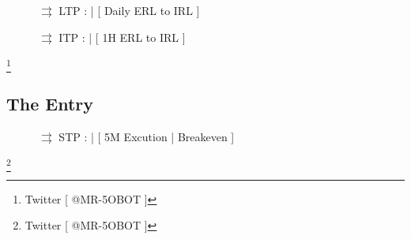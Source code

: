 \documentclass{article}
\begin{document}
\begin{figure}[h]
\begin{notebox}
\noindent \( \rightrightarrows \) \hspace{0.1cm}LTP : | [ Daily ERL to IRL ] 

  \begin{center}
  \end{center}
\end{notebox}

\begin{notebox}
   \( \rightrightarrows \) \hspace{0.1cm}ITP : | [ 1H ERL to IRL ]

  \begin{center}
  \end{center}
\end{notebox}
\end{figure}

\footnote{Twitter [ @MR-5OBOT ]}
\newpage

\subsection{The Entry}
\begin{figure}[h]
\begin{notebox}
  \( \rightrightarrows \) \hspace{0.1cm}STP : | [ 5M Excution | Breakeven ]
   \begin{center}
  \end{center}
\end{notebox}
\end{figure}

\footnote{Twitter [ @MR-5OBOT ]}
\end{document}
